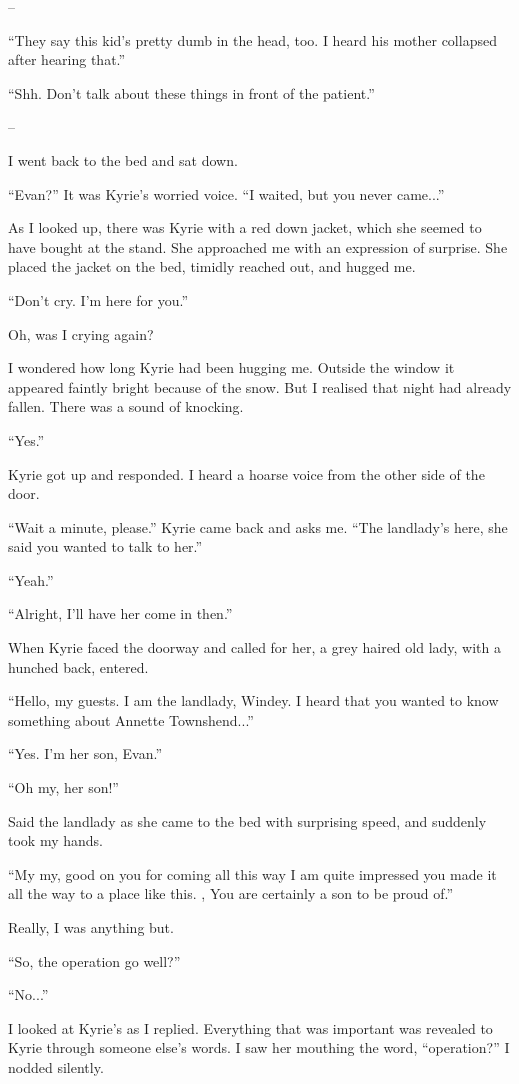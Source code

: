 \documentclass[oneside]{book}
\begin{document}
–

“They say this kid’s pretty dumb in the head, too. I heard his mother collapsed after hearing that.”

“Shh. Don’t talk about these things in front of the patient.”

–

I went back to the bed and sat down.

“Evan?” It was Kyrie’s worried voice. “I waited, but you never came...”

As I looked up, there was Kyrie with a red down jacket, which she seemed to have bought at the stand. She approached me with an expression of surprise. She placed the jacket on the bed, timidly reached out, and hugged me.

“Don’t cry. I’m here for you.”

Oh, was I crying again?

I wondered how long Kyrie had been hugging me. Outside the window it appeared faintly bright because of the snow. But I realised that night had already fallen. There was a sound of knocking.

“Yes.”

Kyrie got up and responded. I heard a hoarse voice from the other side of the door.

“Wait a minute, please.” Kyrie came back and asks me. “The landlady’s here, she said you wanted to talk to her.”

“Yeah.”

“Alright, I’ll have her come in then.”

When Kyrie faced the doorway and called for her, a grey haired old lady, with a hunched back, entered.

“Hello, my guests. I am the landlady, Windey. I heard that you wanted to know something about Annette Townshend...”

“Yes. I’m her son, Evan.”

“Oh my, her son!”

Said the landlady as she came to the bed with surprising speed, and suddenly took my hands.

“My my, good on you for coming all this way I am quite impressed you made it all the way to a place like this. , You are certainly a son to be proud of.”

Really, I was anything but.

“So, the operation go well?”

“No...”

I looked at Kyrie’s as I replied. Everything that was important was revealed to Kyrie through someone else’s words. I saw her mouthing the word, “operation?” I nodded silently.
\end{document}
